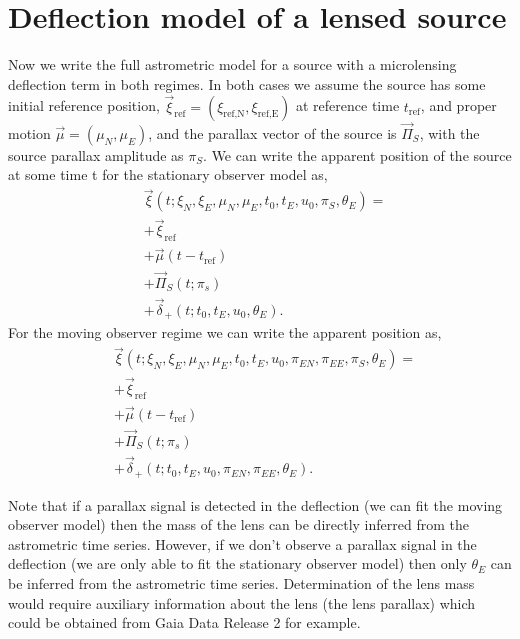 \documentclass[11pt]{article}
\begin{document}
\section{Deflection model of a lensed source}

Now we write the full astrometric model for a source with a microlensing deflection term in both regimes.
In both cases we assume the source has some initial reference position, 
$\vec{\xi}_{\text{ref}}=(\xi_{\text{ref,N}},\xi_{\text{ref,E}})$ at reference time $t_{\text{ref}}$, 
and proper motion $\vec{\mu}=(\mu_{N},\mu_{E})$, and the parallax vector of the source is $\vec{\Pi}_{S}$, with the
source parallax amplitude as $\pi_{S}$. We can write the apparent position of the 
source at some time t for the stationary observer model as,
%
\begin{equation}
\begin{aligned}
&\vec{\xi}(t;\xi_{N},\xi_{E},\mu_{N},\mu_{E},t_{0},t_{E},u_{0},\pi_{S},\theta_{E}) = \\
&+\vec{\xi}_{\text{ref}} \\
&+\vec{\mu}(t-t_{\text{ref}}) \\
&+\vec{\Pi}_{S}(t;\pi_{s})\\
&+\vec{\delta}_{+}(t;t_{0},t_{E},u_{0},\theta_{E}).
\end{aligned}
\end{equation}
%
For the moving observer regime we can write the apparent position as, 
\begin{equation}
\begin{aligned}
&\vec{\xi}(t;\xi_{N},\xi_{E},\mu_{N},\mu_{E},t_{0},t_{E},u_{0},\pi_{EN},\pi_{EE},\pi_{S},\theta_{E}) = \\
&+\vec{\xi}_{\text{ref}} \\
&+\vec{\mu}(t-t_{\text{ref}}) \\
&+\vec{\Pi}_{S}(t;\pi_{s})\\
&+\vec{\delta}_{+}(t;t_{0},t_{E},u_{0},\pi_{EN},\pi_{EE},\theta_{E}).
\end{aligned}
\end{equation}

Note that if a parallax signal is detected in the deflection (we can fit the moving observer model)
then the mass of the lens can be directly inferred from the astrometric time series. However, if we don't observe
a parallax signal in the deflection (we are only able to fit the stationary observer model) then only $\theta_{E}$
can be inferred from the astrometric time series. Determination of the lens mass would require auxiliary information
about the lens (the lens parallax) which could be obtained from Gaia Data Release 2 for example.

 

\end{document}
